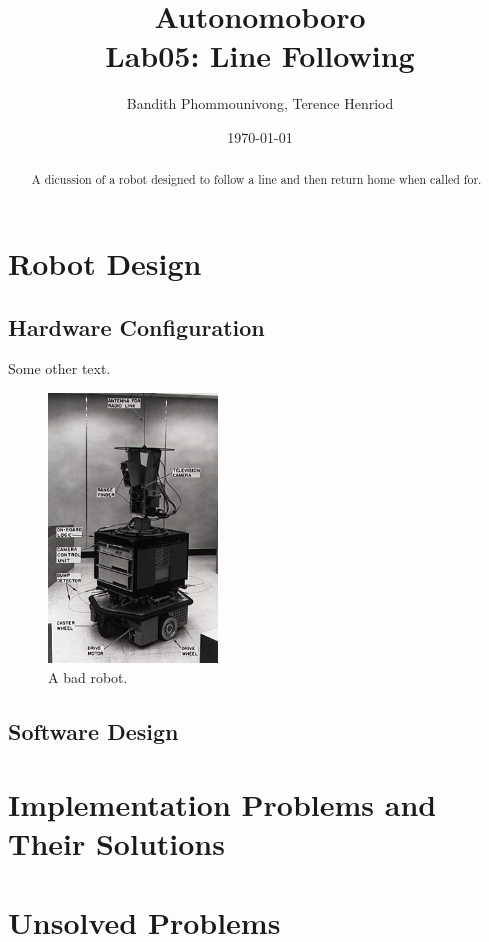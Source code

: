 \documentclass{article}
\title{Autonomoboro \\ Lab05: Line Following}
\author{Bandith Phommounivong, Terence Henriod}
\date{\today}
\begin{document}
\maketitle

\begin{abstract}
A dicussion of a robot designed to follow a line and then return home when called for.
\end{abstract}

\newpage

\section{Robot Design}
	\subsection{Hardware Configuration}

Some other text.

	\begin{figure}[h!]
	\centering
	\includegraphics[width = 0.4\textwidth]{shakey}
	\caption{A bad robot.}
	\label{fig:bad_robot}
	\end{figure}

	\subsection{Software Design}

\section{Implementation Problems and Their Solutions}

\section{Unsolved Problems}
\end{document}

